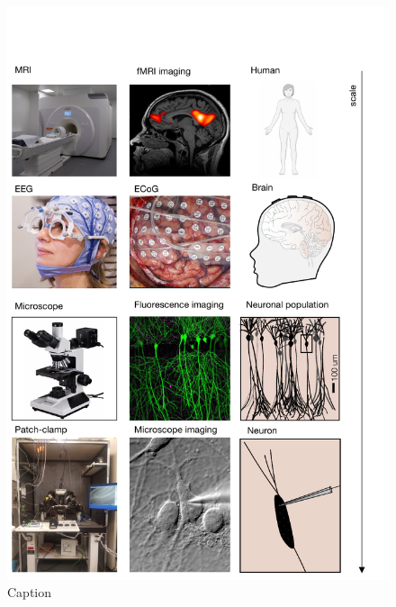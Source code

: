 \newpage
\begin{figure}[h!]
    \centering
    \includegraphics{latex/fig/Intro/Bgd_Tools.pdf}
    \caption{Caption}
    \label{fig:my_label}
\end{figure}



